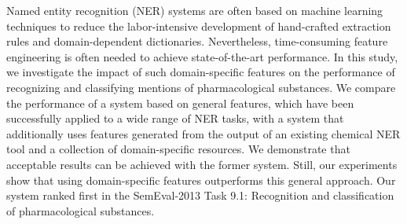 Named entity recognition (NER) systems are often based on machine learning techniques to reduce the labor-intensive development of hand-crafted
 extraction rules and domain-dependent dictionaries. Nevertheless,
 time-consuming feature engineering is often needed to achieve state-of-the-art
 performance. In this study, we investigate the impact of such domain-specific
 features on the performance of recognizing and classifying mentions of
 pharmacological substances. We compare the performance of a system based on
 general features, which have been successfully applied to a wide range of NER
 tasks, with a system that additionally uses features generated from the output
 of an existing chemical NER tool and a collection of domain-specific resources.
 We demonstrate that acceptable results can be achieved with the former system.
 Still, our experiments show that using domain-specific features outperforms
 this general approach. Our system ranked first in the SemEval-2013 Task 9.1:
 Recognition and classification of pharmacological substances.

